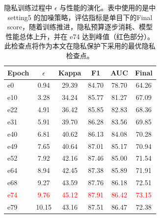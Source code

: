 \begin{table}[!htb]
\centering
\caption{隐私训练过程中 $\epsilon$ 与性能的演化。表中使用的是中 setting5 的加噪策略，评估指标是单目下的Final score，随着训练推进，隐私预算逐步消耗、模型性能总体上升，并在 e74 达到峰值（红色部分）。此检查点将作为本文在隐私保护下采用的最优隐私检查点。}
\label{tab:privacy-evolution}
\begin{tabular}{lccccc}
\toprule
Epoch & $\epsilon$ & Kappa & F1 & AUC & Final \\
\midrule
e0 & 0.94 & 29.39 & 84.70 & 78.70 & 64.26 \\
e10 & 3.28 & 34.24 & 85.77 & 81.27 & 67.09 \\
e22 & 4.91 & 36.42 & 85.85 & 82.83 & 68.36 \\
e31 & 5.91 & 39.70 & 86.28 & 83.56 & 69.85 \\
e40 & 6.81 & 40.62 & 86.13 & 84.08 & 70.28 \\
e49 & 7.65 & 40.64 & 87.01 & 85.17 & 70.94 \\
e52 & 7.92 & 42.16 & 87.46 & 85.00 & 71.54 \\
e64 & 8.94 & 42.45 & 87.38 & 85.89 & 71.91 \\
e68 & 9.27 & 43.59 & 87.76 & 86.18 & 72.51 \\
\textcolor{red}{e74} & \textcolor{red}{9.76} & \textcolor{red}{45.12} & \textcolor{red}{87.91} & \textcolor{red}{86.42} & \textcolor{red}{73.15} \\
e79 & 10.15 & 43.16 & 87.51 & 86.47 & 72.38 \\
\bottomrule
\end{tabular}
\end{table}

